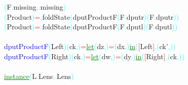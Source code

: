 \textcolor{cyan}{(}{\rm{}F}\textcolor{cyan}{.}{\rm{}missing}\textcolor{cyan}{,}\textcolor{cyan}{.}{\rm{}missing}\textcolor{cyan}{)}\\\hsspace \hsspace \hsspace \textcolor{cyan}{(}{\rm{}Product}\textcolor{cyan}{)}\hsspace \textcolor{red}{=}\textcolor{cyan}{.}{\rm{}foldState}\hsspace \textcolor{cyan}{(}{\rm{}dputProductF}\hsspace \textcolor{cyan}{(}{\rm{}F}\textcolor{cyan}{.}{\rm{}dputr}\textcolor{cyan}{)}\hsspace \textcolor{cyan}{(}{\rm{}F}\textcolor{cyan}{.}{\rm{}dputr}\textcolor{cyan}{)}\textcolor{cyan}{)}\\\hsspace \hsspace \hsspace \textcolor{cyan}{(}{\rm{}Product}\textcolor{cyan}{)}\hsspace \textcolor{red}{=}\textcolor{cyan}{.}{\rm{}foldState}\hsspace \textcolor{cyan}{(}{\rm{}dputProductF}\hsspace \textcolor{cyan}{(}{\rm{}F}\textcolor{cyan}{.}{\rm{}dputl}\textcolor{cyan}{)}\hsspace \textcolor{cyan}{(}{\rm{}F}\textcolor{cyan}{.}{\rm{}dputl}\textcolor{cyan}{)}\textcolor{cyan}{)}\\\\\textcolor{blue}{dputProductF}\hsspace \textcolor{cyan}{(}{\rm{}Left}\hsspace {}\textcolor{cyan}{)}\hsspace \textcolor{cyan}{(}{\rm{}ck}\textcolor{cyan}{,}\textcolor{cyan}{)}\hsspace \textcolor{red}{=}\hsspace \textcolor{green}{\underline{let}}\hsspace \textcolor{cyan}{(}{\rm{}dz}\textcolor{cyan}{,}\textcolor{cyan}{)}\hsspace \textcolor{red}{=}\hsspace \textcolor{cyan}{(}{\rm{}dx}\textcolor{cyan}{,}\textcolor{cyan}{)}\hsspace \textcolor{green}{\underline{in}}\hsspace \textcolor{cyan}{(}\textcolor{red}{[}{\rm{}Left}\hsspace {}\textcolor{red}{]}\textcolor{cyan}{,}\hsspace \textcolor{cyan}{(}{\rm{}ck'}\textcolor{cyan}{,}\textcolor{cyan}{)}\textcolor{cyan}{)}\\\textcolor{blue}{dputProductF}\hsspace \textcolor{cyan}{(}{\rm{}Right}\textcolor{cyan}{)}\hsspace \textcolor{cyan}{(}{\rm{}ck}\textcolor{cyan}{,}\textcolor{cyan}{)}\hsspace \textcolor{red}{=}\hsspace \textcolor{green}{\underline{let}}\hsspace \textcolor{cyan}{(}{\rm{}dw}\textcolor{cyan}{,}\textcolor{cyan}{)}\hsspace \textcolor{red}{=}\hsspace \textcolor{cyan}{(}{\rm{}dy}\textcolor{cyan}{,}\textcolor{cyan}{)}\hsspace \textcolor{green}{\underline{in}}\hsspace \textcolor{cyan}{(}\textcolor{red}{[}{\rm{}Right}\textcolor{red}{]}\textcolor{cyan}{,}\hsspace \textcolor{cyan}{(}{\rm{}ck}\textcolor{cyan}{,}\textcolor{cyan}{)}\textcolor{cyan}{)}\\\\\textcolor{green}{\underline{instance}}\hsspace \textcolor{cyan}{(}{\rm{}L}\textcolor{cyan}{.}{\rm{}Lens}\textcolor{cyan}{,}\textcolor{cyan}{.}{\rm{}Lens}\textcolor{cyan}{)}\hsspace 